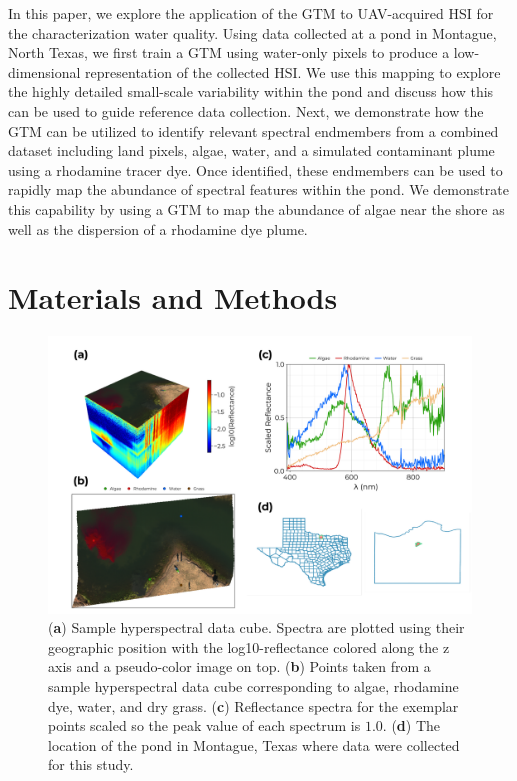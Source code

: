 \documentclass[remotesensing,article,submit,pdftex,moreauthors]{Definitions/mdpi}
\begin{document}
In this paper, we explore the application of the GTM to UAV-acquired HSI for the characterization water quality. Using data collected at a pond in Montague, North Texas, we first train a GTM using water-only pixels to produce a low-dimensional representation of the collected HSI. We use this mapping to explore the highly detailed small-scale variability within the pond and discuss how this can be used to guide reference data collection. Next, we demonstrate how the GTM can be utilized to identify relevant spectral endmembers from a combined dataset including land pixels, algae, water, and a simulated contaminant plume using a rhodamine tracer dye. Once identified, these endmembers can be used to rapidly map the abundance of spectral features within the pond. We demonstrate this capability by using a GTM to map the abundance of algae near the shore as well as the dispersion of a rhodamine dye plume. 



\section{Materials and Methods}


\begin{figure}[t]
\centering
\includegraphics[width=\columnwidth]{paper/figures/methods/sample-spectra.pdf}
\caption{(\textbf{a}) Sample hyperspectral data cube. Spectra are plotted using their geographic position with the log10-reflectance colored along the z axis and a pseudo-color image on top. (\textbf{b}) Points taken from a sample hyperspectral data cube corresponding to algae, rhodamine dye, water, and dry grass. (\textbf{c}) Reflectance spectra for the exemplar points scaled so the peak value of each spectrum is $1.0$. (\textbf{d}) The location of the pond in Montague, Texas where data were collected for this study.\label{fig:sample-spectra}}
\end{figure}  
\end{document}
